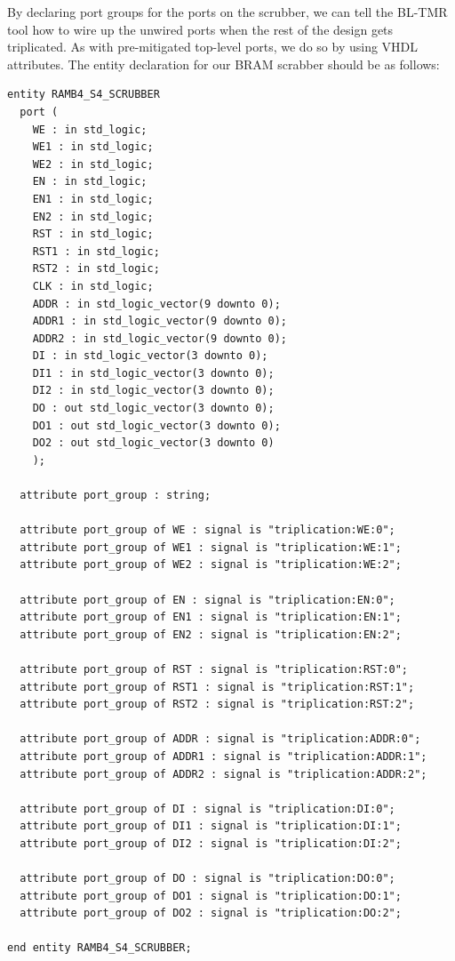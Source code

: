 By declaring port groups for the ports on the scrubber, we can tell the BL-TMR
tool how to wire up the unwired ports when the rest of the design gets
triplicated. As with pre-mitigated top-level ports, we do so by using VHDL
attributes. The entity declaration for our BRAM scrabber should be as follows:
\begin{verbatim}
entity RAMB4_S4_SCRUBBER
  port (
    WE : in std_logic;
    WE1 : in std_logic;
    WE2 : in std_logic;
    EN : in std_logic;
    EN1 : in std_logic;
    EN2 : in std_logic;
    RST : in std_logic;
    RST1 : in std_logic;
    RST2 : in std_logic;
    CLK : in std_logic;
    ADDR : in std_logic_vector(9 downto 0);
    ADDR1 : in std_logic_vector(9 downto 0);
    ADDR2 : in std_logic_vector(9 downto 0);
    DI : in std_logic_vector(3 downto 0);
    DI1 : in std_logic_vector(3 downto 0);
    DI2 : in std_logic_vector(3 downto 0);
    DO : out std_logic_vector(3 downto 0);
    DO1 : out std_logic_vector(3 downto 0);
    DO2 : out std_logic_vector(3 downto 0)
    );

  attribute port_group : string;

  attribute port_group of WE : signal is "triplication:WE:0";
  attribute port_group of WE1 : signal is "triplication:WE:1";
  attribute port_group of WE2 : signal is "triplication:WE:2";
  
  attribute port_group of EN : signal is "triplication:EN:0";
  attribute port_group of EN1 : signal is "triplication:EN:1";
  attribute port_group of EN2 : signal is "triplication:EN:2";

  attribute port_group of RST : signal is "triplication:RST:0";
  attribute port_group of RST1 : signal is "triplication:RST:1";
  attribute port_group of RST2 : signal is "triplication:RST:2";

  attribute port_group of ADDR : signal is "triplication:ADDR:0";
  attribute port_group of ADDR1 : signal is "triplication:ADDR:1";
  attribute port_group of ADDR2 : signal is "triplication:ADDR:2";

  attribute port_group of DI : signal is "triplication:DI:0";
  attribute port_group of DI1 : signal is "triplication:DI:1";
  attribute port_group of DI2 : signal is "triplication:DI:2";

  attribute port_group of DO : signal is "triplication:DO:0";
  attribute port_group of DO1 : signal is "triplication:DO:1";
  attribute port_group of DO2 : signal is "triplication:DO:2";
  
end entity RAMB4_S4_SCRUBBER;
\end{verbatim}

